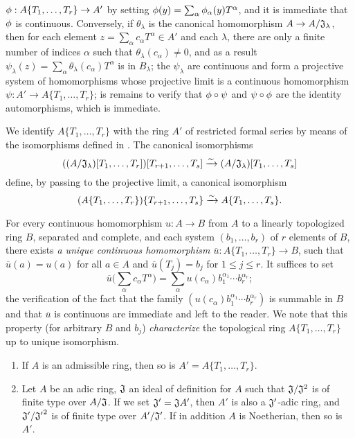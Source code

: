 \begin{env}[7.5.1]
$\phi:A\{T_1,\dots,T_r\}\to A'$ by setting
$\phi(y)=\sum_\alpha\phi_\alpha(y)T^\alpha$, and it is immediate that $\phi$ is
continuous. Conversely, if $\theta_\lambda$ is the canonical homomorphism
$A\to A/\mathfrak{J}_\lambda$, then for each element
$z=\sum_\alpha c_\alpha T^\alpha\in A'$ and each $\lambda$, there are only a finite
number of indices $\alpha$ such that $\theta_\lambda(c_\alpha)\neq 0$, and as a
result $\psi_\lambda(z)=\sum_\alpha\theta_\lambda(c_\alpha)T^\alpha$ is in
$B_\lambda$; the $\psi_\lambda$ are continuous and form a projective system of
homomorphisms whose projective limit is a continuous homomorphism
$\psi:A'\to A\{T_1,\dots,T_r\}$; is remains to verify that $\phi\circ\psi$ and
$\psi\circ\phi$ are the identity automorphisms, which is immediate.
\end{env}

\begin{env}[7.5.2]
\label{0.7.5.2}
We identify $A\{T_1,\dots,T_r\}$ with the ring $A'$ of restricted formal series by
means of the isomorphisms defined in . The canonical
isomorphisms
\[
  ((A/\mathfrak{J}_\lambda)[T_1,\dots,T_r])[T_{r+1},\dots,T_s]
  \xrightarrow{\sim}(A/\mathfrak{J}_\lambda)[T_1,\dots,T_s]
\]
define, by passing to the projective limit, a canonical isomorphism
\[
  (A\{T_1,\dots,T_r\})\{T_{r+1},\dots,T_s\}
  \xrightarrow{\sim} A\{T_1,\dots,T_s\}.
\]
\end{env}

\begin{env}[7.5.3]
\label{0.7.5.3}
For every continuous homomorphism $u:A\to B$ from $A$ to a linearly topologized ring
$B$, separated and complete, and each system $(b_1,\dots,b_r)$ of $r$ elements of $B$,
there exists {\em a unique continuous homomorphism $\overline{u}:A\{T_1,\dots,T_r\}\to B$},
such that $\overline{u}(a)=u(a)$ for all $a\in A$ and $\overline{u}(T_j)=b_j$ for
$1\leqslant j\leqslant r$. It suffices to set
\[
  \overline{u}\big(\sum_\alpha c_\alpha T^\alpha\big)
  =\sum_\alpha u(c_\alpha)b_1^{\alpha_1}\cdots b_r^{\alpha_r};
\]
the verification of the fact that the family $(u(c_\alpha)b_1^{\alpha_1}\cdots b_r^{\alpha_r})$
is summable in $B$ and that $\overline{u}$ is continuous are immediate and left to the
reader. We note that this property (for arbitrary $B$ and $b_j$) {\em characterize} the
topological ring $A\{T_1,\dots,T_r\}$ up to unique isomorphism.
\end{env}

\begin{prop}[7.5.4]
\label{0.7.5.4}
\medskip\noindent
\begin{enumerate}[label={\rm(\roman*)}]
  \item If $A$ is an admissible ring, then so is $A'=A\{T_1,\dots,T_r\}$.
  \item Let $A$ be an adic ring, $\mathfrak{J}$ an ideal of definition for
    $A$ such that $\mathfrak{J}/\mathfrak{J}^2$ is of finite type
    over $A/\mathfrak{J}$. If we set $\mathfrak{J}'=\mathfrak{J}A'$, then $A'$ is also a
    $\mathfrak{J}'$-adic ring, and $\mathfrak{J}'/{\mathfrak{J}'}^2$ is of finite type over
    $A'/\mathfrak{J}'$. If in addition $A$ is Noetherian, then so is $A'$.
\end{enumerate}
\end{prop}

